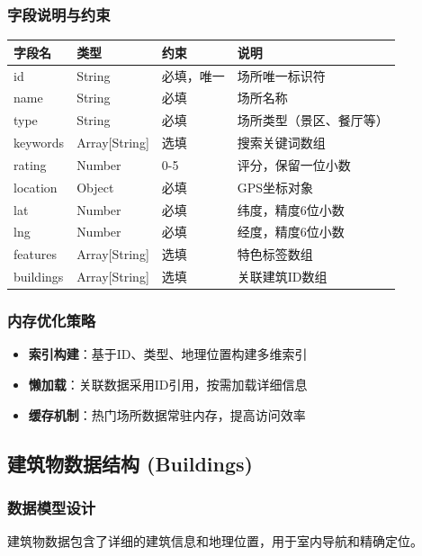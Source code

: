 \documentclass[12pt,a4paper]{article}
\begin{document}
\subsubsection{字段说明与约束}
\begin{table}[H]
\centering
\begin{tabular}{|l|l|l|p{4cm}|}
\hline
\textbf{字段名} & \textbf{类型} & \textbf{约束} & \textbf{说明} \\
\hline
id & String & 必填，唯一 & 场所唯一标识符 \\
name & String & 必填 & 场所名称 \\
type & String & 必填 & 场所类型（景区、餐厅等） \\
keywords & Array[String] & 选填 & 搜索关键词数组 \\
rating & Number & 0-5 & 评分，保留一位小数 \\
location & Object & 必填 & GPS坐标对象 \\
lat & Number & 必填 & 纬度，精度6位小数 \\
lng & Number & 必填 & 经度，精度6位小数 \\
features & Array[String] & 选填 & 特色标签数组 \\
buildings & Array[String] & 选填 & 关联建筑ID数组 \\
\hline
\end{tabular}
\end{table}

\subsubsection{内存优化策略}
\begin{itemize}
    \item \textbf{索引构建}：基于ID、类型、地理位置构建多维索引
    \item \textbf{懒加载}：关联数据采用ID引用，按需加载详细信息
    \item \textbf{缓存机制}：热门场所数据常驻内存，提高访问效率
\end{itemize}

\subsection{建筑物数据结构 (Buildings)}

\subsubsection{数据模型设计}
建筑物数据包含了详细的建筑信息和地理位置，用于室内导航和精确定位。
\end{document}

